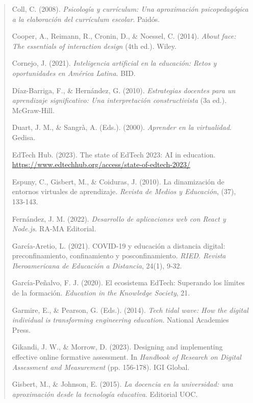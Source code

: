 \documentclass[12pt,a4paper]{report}
\begin{document}
\begin{quote}
\begin{thebibliography}{99}
Coll, C. (2008). \textit{Psicología y currículum: Una aproximación psicopedagógica a la elaboración del currículum escolar}. Paidós.

Cooper, A., Reimann, R., Cronin, D., \& Noessel, C. (2014). \textit{About face: The essentials of interaction design} (4th ed.). Wiley.

Cornejo, J. (2021). \textit{Inteligencia artificial en la educación: Retos y oportunidades en América Latina}. BID.

Díaz-Barriga, F., \& Hernández, G. (2010). \textit{Estrategias docentes para un aprendizaje significativo: Una interpretación constructivista} (3a ed.). McGraw-Hill.

Duart, J. M., \& Sangrà, A. (Eds.). (2000). \textit{Aprender en la virtualidad}. Gedisa.

EdTech Hub. (2023). The state of EdTech 2023: AI in education. \url{https://www.edtechhub.org/access/state-of-edtech-2023/}

Espuny, C., Gisbert, M., \& Coiduras, J. (2010). La dinamización de entornos virtuales de aprendizaje. \textit{Revista de Medios y Educación}, (37), 133-143.

Fernández, J. M. (2022). \textit{Desarrollo de aplicaciones web con React y Node.js}. RA-MA Editorial.

García-Aretio, L. (2021). COVID-19 y educación a distancia digital: preconfinamiento, confinamiento y posconfinamiento. \textit{RIED. Revista Iberoamericana de Educación a Distancia}, 24(1), 9-32.

García-Peñalvo, F. J. (2020). El ecosistema EdTech: Superando los límites de la formación. \textit{Education in the Knowledge Society}, 21.

Garmire, E., \& Pearson, G. (Eds.). (2014). \textit{Tech tidal wave: How the digital individual is transforming engineering education}. National Academies Press.

Gikandi, J. W., \& Morrow, D. (2023). Designing and implementing effective online formative assessment. In \textit{Handbook of Research on Digital Assessment and Measurement} (pp. 156-178). IGI Global.

Gisbert, M., \& Johnson, E. (2015). \textit{La docencia en la universidad: una aproximación desde la tecnología educativa}. Editorial UOC.


\end{thebibliography}
\end{quote}
\end{document}
